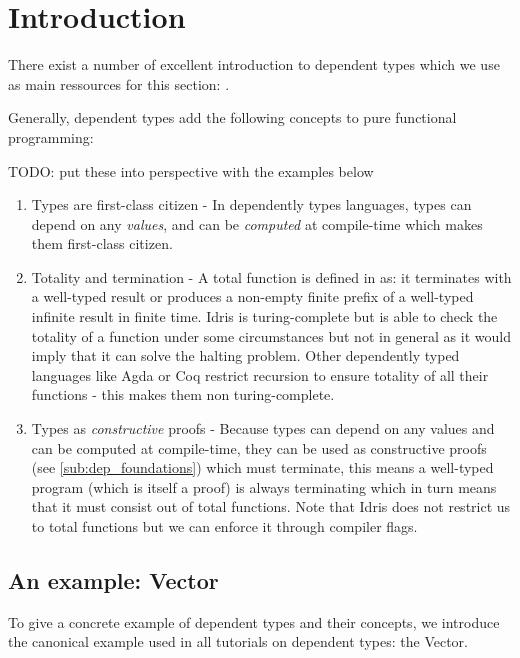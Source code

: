 \section{Introduction}
\label{sec:dep_background}

There exist a number of excellent introduction to dependent types which we use as main ressources for this section: \cite{thompson_type_1991, program_homotopy_2013, stump_verified_2016, brady_type-driven_2017, pierce_programming_2018}.

Generally, dependent types add the following concepts to pure functional programming:

TODO: put these into perspective with the examples below
\begin{enumerate}
	\item Types are first-class citizen - In dependently types languages, types can depend on any \textit{values}, and can be \textit{computed} at compile-time which makes them first-class citizen.

	\item Totality and termination - A total function is defined in \cite{brady_type-driven_2017} as: it terminates with a well-typed result or produces a non-empty finite prefix of a well-typed infinite result in finite time. Idris is turing-complete but is able to check the totality of a function under some circumstances but not in general as it would imply that it can solve the halting problem. Other dependently typed languages like Agda or Coq restrict recursion to ensure totality of all their functions - this makes them non turing-complete.

	\item Types as \textit{constructive} proofs - Because types can depend on any values and can be computed at compile-time, they can be used as constructive proofs (see \ref{sub:dep_foundations}) which must terminate, this means a well-typed program (which is itself a proof) is always terminating which in turn means that it must consist out of total functions. Note that Idris does not restrict us to total functions but we can enforce it through compiler flags.
\end{enumerate}

\subsection{An example: Vector}
To give a concrete example of dependent types and their concepts, we introduce the canonical example used in all tutorials on dependent types: the Vector.

